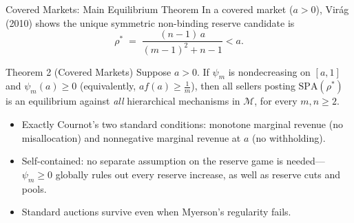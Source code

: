 \documentclass[11pt,aspectratio=169]{beamer}
\def\meditem{\smallskip\item}
\newcommand{\SPA}{\mathrm{SPA}}
\begin{document}
\begin{frame}{Covered Markets: Main Equilibrium Theorem}
In a covered market ($a>0$), Vir\'ag (2010) shows the unique symmetric non-binding reserve candidate is
\[
\rho^* \;=\; \frac{(n-1)\,a}{(m-1)^2 + n - 1} < a.
\]

\medskip
\begin{block}{Theorem 2 (Covered Markets)}
Suppose $a>0$. If $\psi_m$ is nondecreasing on $[a,1]$ and $\psi_m(a)\ge 0$ (equivalently, $af(a)\ge\frac1m$), then all sellers posting $\SPA(\rho^*)$ is an equilibrium against \emph{all} hierarchical mechanisms in $\mathcal M$, for every $m,n\ge 2$.
\end{block}

\begin{itemize}
\item Exactly Cournot's two standard conditions: monotone marginal revenue (no misallocation) and nonnegative marginal revenue at $a$ (no withholding).
\meditem \alert{Self-contained}: no separate assumption on the reserve game is needed---$\psi_m\ge 0$ globally rules out every reserve increase, as well as reserve cuts and pools.
\meditem Standard auctions survive even when Myerson's regularity fails.
\end{itemize}
\end{frame}
\end{document}
